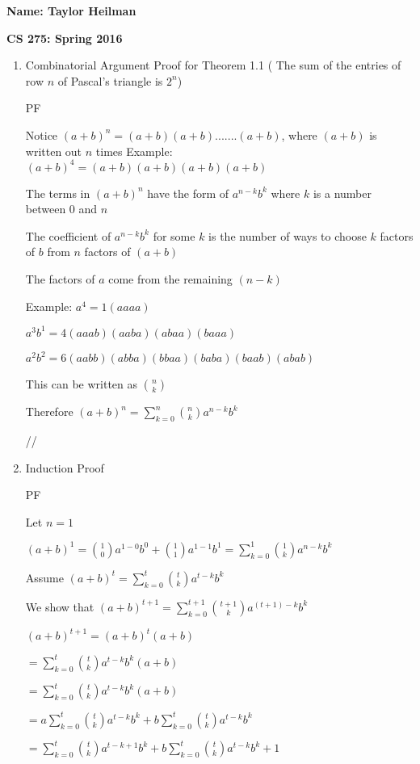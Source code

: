 \documentclass[12pt]{article}
\begin{document}
\textbf{Name: Taylor Heilman}    \hspace{4in} 
\begin{center} \textbf{CS 275: Spring 2016} \end{center}

\begin{enumerate}

\item Combinatorial Argument Proof for Theorem 1.1 ( The sum of the entries of row $n$ of Pascal's triangle is $2^n$)

{PF

Notice $(a+b)^n = (a+b)(a+b).......(a+b)$, where $(a+b)$ is written out $n$ times
Example: $(a+b)^4 = (a+b)(a+b)(a+b)(a+b)$

The terms in $(a+b)^n$ have the form of $a^{n-k}b^k$ where $k$ is a number between $0$ and $n$

The coefficient of $a^{n-k}b^k$ for some $k$ is the number of ways to choose $k$ factors of $b$ from $n$ factors of $(a+b)$ 

The factors of $a$ come from the remaining $(n-k)$

Example: $a^4 = 1 (aaaa)$
	       
$a^3b^1 = 4 (aaab)(aaba)(abaa)(baaa)$

$a^2b^2 = 6 (aabb)(abba)(bbaa)(baba)(baab)(abab)$

This can be written as $ {n \choose k}$

Therefore $(a+b)^n = \sum_{k=0}^{n} {n \choose k} a^{n-k}b^k$

//}

\item Induction Proof

{
PF

Let $n=1$

$(a+b)^1 =  {1 \choose 0}a^{1-0}b^0 + {1 \choose 1}a^{1-1}b^1 = \sum_{k=0}^{1} {1 \choose k} a^{n-k}b^k$

Assume $(a+b)^{t} = \sum_{k=0}^{t} {t \choose k} a^{t-k}b^k$

We show that $(a+b)^{t+1} = \sum_{k=0}^{t+1} {t+1 \choose k} a^{(t+1)-k}b^k$

 $(a+b)^{t+1} = (a+b)^t (a+b)$
 
 $= \sum_{k=0}^{t} {t \choose k} a^{t-k}b^k (a+b)$
 
 $= \sum_{k=0}^{t} {t \choose k} a^{t-k}b^k (a+b)$

$=a\sum_{k=0}^{t} {t \choose k} a^{t-k}b^k  + b\sum_{k=0}^{t} {t \choose k}a^{t-k}b^k  $

$=\sum_{k=0}^{t} {t \choose k} a^{t-k+1}b^k  + b\sum_{k=0}^{t} {t \choose k}a^{t-k}b^k+1  $

}
\end{enumerate}
\end{document}
